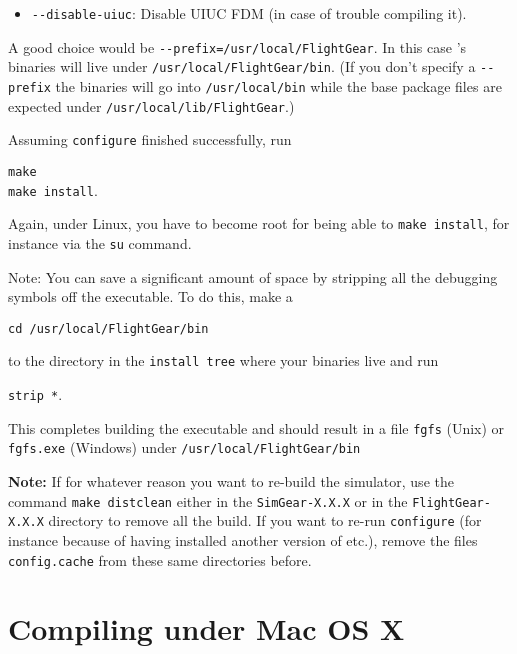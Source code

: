 \begin{enumerate}
\begin{itemize}
\item{\texttt{-$ $-disable-uiuc}}: Disable UIUC FDM (in case of trouble compiling it).
\end{itemize}

A good choice would be \texttt{-$ $-prefix=/usr/local/FlightGear}. In this case
\FlightGear{}'s binaries will live under
\texttt{/usr/local/FlightGear/bin}. (If you don't specify a \texttt{-$ $-prefix} the binaries will go into \texttt{/usr/local/bin} while the base package files are expected under \texttt{/usr/local/lib/FlightGear}.)

Assuming \texttt{configure} finished successfully, run
 \medskip

        \texttt{make}\\
        \texttt{make install}.

 \noindent
 Again, under Linux, you have to become root for being able to \texttt{make
install}, for instance via the \texttt{su} command.

 \noindent
 Note:  You can save a significant amount of space by stripping all the
    debugging symbols off the executable.  To do this, make a
     \medskip

    \texttt{cd /usr/local/FlightGear/bin}

 \noindent
    to the directory in the \texttt{install tree} where your binaries live and run
     \medskip

    \texttt{strip *}.
  \end{enumerate}


 This completes building the executable and should result in a file \texttt{fgfs} (Unix) or
 \texttt{fgfs.exe} (Windows) under \texttt{/usr/local/FlightGear/bin}

\textbf{Note:} If for whatever reason you want to re-build the simulator, use the command
\texttt{make distclean} either in the \texttt{SimGear-X.X.X} or in the
\texttt{FlightGear-X.X.X} directory to remove all the build. If you want to re-run
\texttt{configure} (for instance because of having installed another version of \PLIB{}
etc.), remove the files \texttt{config.cache} from these same directories before.

\section{Compiling \FlightGear{} under Mac OS X }

